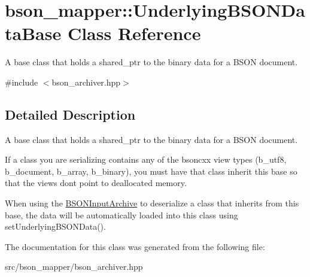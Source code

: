 \hypertarget{classbson__mapper_1_1UnderlyingBSONDataBase}{}\section{bson\+\_\+mapper\+:\+:Underlying\+B\+S\+O\+N\+Data\+Base Class Reference}
\label{classbson__mapper_1_1UnderlyingBSONDataBase}


A base class that holds a shared\+\_\+ptr to the binary data for a B\+S\+ON document.  




{\ttfamily \#include $<$bson\+\_\+archiver.\+hpp$>$}



\subsection{Detailed Description}
A base class that holds a shared\+\_\+ptr to the binary data for a B\+S\+ON document. 

If a class you are serializing contains any of the bsoncxx view types (b\+\_\+utf8, b\+\_\+document, b\+\_\+array, b\+\_\+binary), you must have that class inherit this base so that the views don\textquotesingle{}t point to deallocated memory.

When using the \hyperlink{classbson__mapper_1_1BSONInputArchive}{B\+S\+O\+N\+Input\+Archive} to deserialize a class that inherits from this base, the data will be automatically loaded into this class using set\+Underlying\+B\+S\+O\+N\+Data(). 

The documentation for this class was generated from the following file\+:\begin{DoxyCompactItemize}
\item 
src/bson\+\_\+mapper/bson\+\_\+archiver.\+hpp\end{DoxyCompactItemize}

